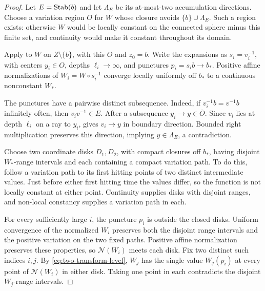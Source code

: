 \begin{proof}
Let $E=\operatorname{Stab}(b)$ and let $\Lambda_E$ be its at-most-two accumulation
directions. Choose a variation region $O$ for $W$ whose closure avoids
$\{b\}\cup\Lambda_E$. Such a region exists: otherwise $W$ would
be locally constant on the connected sphere minus this finite set,
and continuity would make it constant throughout its domain.

Apply  to $W$ on $Z\setminus\{b\}$,
with this $O$ and $z_0=b$. Write the expansions as $s_i=v_i^{-1}$,
with centers $y_i\in O$, depths $\ell_i\to\infty$, and punctures
$p_i=s_i b\to b_*$. Positive affine normalizations of
$W_i=W\circ s_i^{-1}$ converge locally uniformly off $b_*$ to a
continuous nonconstant $W_*$.

The punctures have a pairwise distinct subsequence. Indeed, if
$v_i^{-1}b=v^{-1}b$ infinitely often, then $v_i v^{-1}\in E$.
After a subsequence $y_i\to y\in\overline O$. Since $v_i$ lies at
depth $\ell_i$ on a ray to $y_i$,  gives $v_i\to y$
in boundary direction. Bounded right multiplication preserves this
direction, implying $y\in\Lambda_E$, a contradiction.

Choose two coordinate disks $D_1,D_2$, with compact closures off $b_*$,
having disjoint $W_*$-range intervals and each containing a compact
variation path. To do this, follow a variation path to its first
hitting points of two distinct intermediate values. Just before either
first hitting time the values differ, so the function is not locally
constant at either point. Continuity supplies disks with disjoint
ranges, and non-local constancy supplies a variation path in each.

For every sufficiently large $i$, the puncture $p_i$ is outside the
closed disks. Uniform convergence of the normalized $W_i$ preserves
both the disjoint range intervals and the positive variation on the
two fixed paths. Positive affine normalization preserves these
properties, so $\mathcal N(W_i)$ meets each disk.
Fix two distinct such indices $i,j$. By
\eqref{eq:two-transform-level}, $W_j$ has the single value $W_j(p_i)$
at every point of $\mathcal N(W_i)$ in either disk. Taking one point
in each contradicts the disjoint $W_j$-range intervals.
\end{proof}
